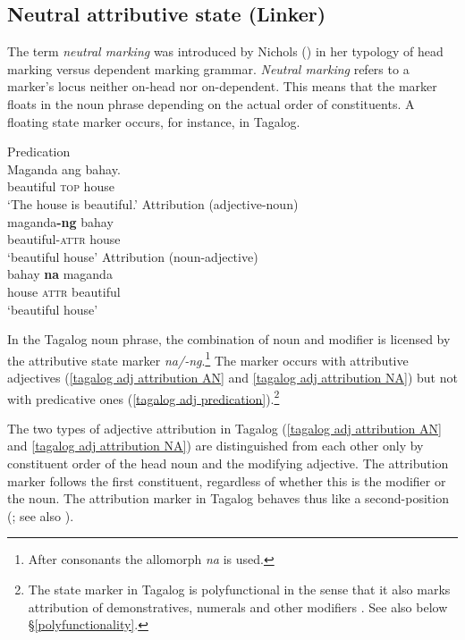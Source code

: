 \subsection[Neutral attributive state]{Neutral attributive state (Linker)} \label{linker}
The term \emph{neutral marking} was introduced by Nichols (\citeyear{nichols1986}) in her typology of head marking versus dependent marking grammar. \emph{Neutral marking} refers to a marker's locus neither on-head nor on-dependent. This means that the marker floats in the noun phrase depending on the actual order of constituents. A floating state marker occurs, for instance, in Tagalog.
\begin{exe} 
\ex 
{} \label{tagalog linker}
\begin{xlist}
\ex 	\rm{Predication}\\
\gll Maganda ang bahay.\\
	beautiful \textsc{top} house\\
\glt	‘The house is beautiful.’\label{tagalog adj predication}
\ex	\rm{Attribution (adjective-noun)}\\
\gll maganda\textbf{-ng} bahay\\
	beautiful-\textsc{attr} house\\
\glt	‘beautiful house’\label{tagalog adj attribution AN}
\ex	\rm{Attribution (noun-adjective)}\\
\gll bahay \textbf{na} maganda\\
	house \textsc{attr} beautiful\\
\glt	‘beautiful house’ \label{tagalog adj attribution NA}
\end{xlist}
\end{exe}
In the Tagalog noun phrase, the combination of noun and modifier is licens\-ed by the attributive state marker \textit{na/-ng}.\footnote{After consonants the allomorph \textit{na} is used.} The marker occurs with attributive adjectives (\ref{tagalog adj attribution AN} and \ref{tagalog adj attribution NA}) but not with predicative ones (\ref{tagalog adj predication}).\footnote{The state marker in Tagalog is polyfunctional in the sense that it also marks attribution of demonstratives, numerals and other modifiers \cite[160–161]{himmelmann1997}. See also below \S\ref{polyfunctionality}.}

The two types of adjective attribution in Tagalog (\ref{tagalog adj attribution AN} and \ref{tagalog adj attribution NA}) are distinguished from each other only by constituent order of the head noun and the modifying adjective. The attribution marker follows the first constituent, regardless of whether this is the modifier or the noun. The attribution marker in Tagalog behaves thus like a second-position  (\citealt[65]{nichols1986}; see also \citealt[160, 162]{himmelmann1997}).

